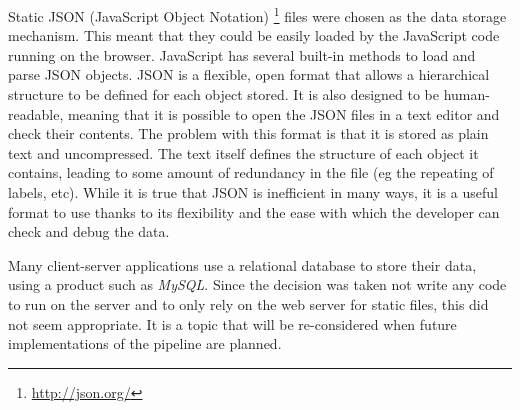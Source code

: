 Static JSON (JavaScript Object Notation) \footnote{\url{http://json.org/}} files were chosen as the data storage mechanism. This meant that they could be easily loaded by the JavaScript code running on the browser. JavaScript has several built-in methods to load and parse JSON objects. JSON is a flexible, open format that allows a hierarchical structure to be defined for each object stored. It is also designed to be human-readable, meaning that it is possible to open the JSON files in a text editor and check their contents. The problem with this format is that it is stored as plain text and uncompressed. The text itself defines the structure of each object it contains, leading to some amount of redundancy in the file (eg the repeating of labels, etc). While it is true that JSON is inefficient in many ways, it is a useful format to use thanks to its flexibility and the ease with which the developer can check and debug the data. 

Many client-server applications use a relational database to store their data, using a product such as \emph{MySQL}. Since the decision was taken not write any code to run on the server and to only rely on the web server for static files, this did not seem appropriate. It is a topic that will be re-considered when future implementations of the pipeline are planned. 


